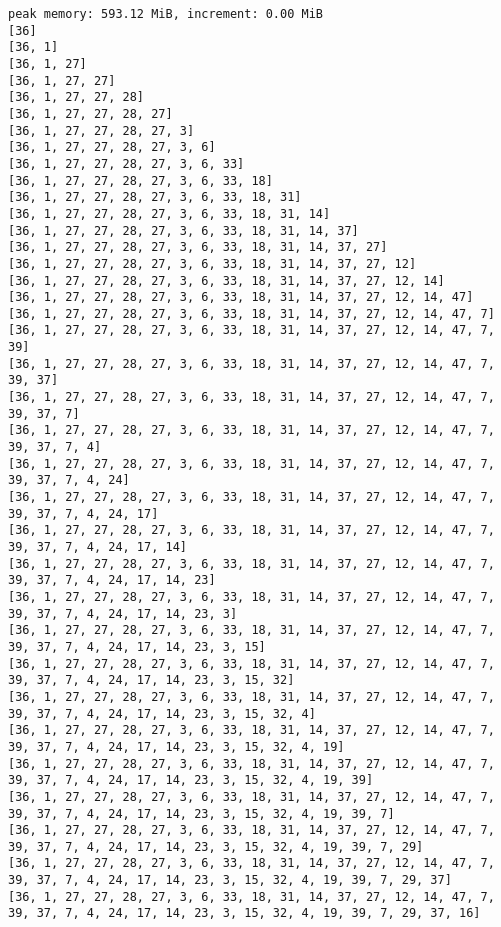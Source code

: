 \documentclass[11pt]{article}
\begin{document}
    \begin{Verbatim}[commandchars=\\\{\}]
peak memory: 593.12 MiB, increment: 0.00 MiB
[36]
[36, 1]
[36, 1, 27]
[36, 1, 27, 27]
[36, 1, 27, 27, 28]
[36, 1, 27, 27, 28, 27]
[36, 1, 27, 27, 28, 27, 3]
[36, 1, 27, 27, 28, 27, 3, 6]
[36, 1, 27, 27, 28, 27, 3, 6, 33]
[36, 1, 27, 27, 28, 27, 3, 6, 33, 18]
[36, 1, 27, 27, 28, 27, 3, 6, 33, 18, 31]
[36, 1, 27, 27, 28, 27, 3, 6, 33, 18, 31, 14]
[36, 1, 27, 27, 28, 27, 3, 6, 33, 18, 31, 14, 37]
[36, 1, 27, 27, 28, 27, 3, 6, 33, 18, 31, 14, 37, 27]
[36, 1, 27, 27, 28, 27, 3, 6, 33, 18, 31, 14, 37, 27, 12]
[36, 1, 27, 27, 28, 27, 3, 6, 33, 18, 31, 14, 37, 27, 12, 14]
[36, 1, 27, 27, 28, 27, 3, 6, 33, 18, 31, 14, 37, 27, 12, 14, 47]
[36, 1, 27, 27, 28, 27, 3, 6, 33, 18, 31, 14, 37, 27, 12, 14, 47, 7]
[36, 1, 27, 27, 28, 27, 3, 6, 33, 18, 31, 14, 37, 27, 12, 14, 47, 7, 39]
[36, 1, 27, 27, 28, 27, 3, 6, 33, 18, 31, 14, 37, 27, 12, 14, 47, 7, 39, 37]
[36, 1, 27, 27, 28, 27, 3, 6, 33, 18, 31, 14, 37, 27, 12, 14, 47, 7, 39, 37, 7]
[36, 1, 27, 27, 28, 27, 3, 6, 33, 18, 31, 14, 37, 27, 12, 14, 47, 7, 39, 37, 7, 4]
[36, 1, 27, 27, 28, 27, 3, 6, 33, 18, 31, 14, 37, 27, 12, 14, 47, 7, 39, 37, 7, 4, 24]
[36, 1, 27, 27, 28, 27, 3, 6, 33, 18, 31, 14, 37, 27, 12, 14, 47, 7, 39, 37, 7, 4, 24, 17]
[36, 1, 27, 27, 28, 27, 3, 6, 33, 18, 31, 14, 37, 27, 12, 14, 47, 7, 39, 37, 7, 4, 24, 17, 14]
[36, 1, 27, 27, 28, 27, 3, 6, 33, 18, 31, 14, 37, 27, 12, 14, 47, 7, 39, 37, 7, 4, 24, 17, 14, 23]
[36, 1, 27, 27, 28, 27, 3, 6, 33, 18, 31, 14, 37, 27, 12, 14, 47, 7, 39, 37, 7, 4, 24, 17, 14, 23, 3]
[36, 1, 27, 27, 28, 27, 3, 6, 33, 18, 31, 14, 37, 27, 12, 14, 47, 7, 39, 37, 7, 4, 24, 17, 14, 23, 3, 15]
[36, 1, 27, 27, 28, 27, 3, 6, 33, 18, 31, 14, 37, 27, 12, 14, 47, 7, 39, 37, 7, 4, 24, 17, 14, 23, 3, 15, 32]
[36, 1, 27, 27, 28, 27, 3, 6, 33, 18, 31, 14, 37, 27, 12, 14, 47, 7, 39, 37, 7, 4, 24, 17, 14, 23, 3, 15, 32, 4]
[36, 1, 27, 27, 28, 27, 3, 6, 33, 18, 31, 14, 37, 27, 12, 14, 47, 7, 39, 37, 7, 4, 24, 17, 14, 23, 3, 15, 32, 4, 19]
[36, 1, 27, 27, 28, 27, 3, 6, 33, 18, 31, 14, 37, 27, 12, 14, 47, 7, 39, 37, 7, 4, 24, 17, 14, 23, 3, 15, 32, 4, 19, 39]
[36, 1, 27, 27, 28, 27, 3, 6, 33, 18, 31, 14, 37, 27, 12, 14, 47, 7, 39, 37, 7, 4, 24, 17, 14, 23, 3, 15, 32, 4, 19, 39, 7]
[36, 1, 27, 27, 28, 27, 3, 6, 33, 18, 31, 14, 37, 27, 12, 14, 47, 7, 39, 37, 7, 4, 24, 17, 14, 23, 3, 15, 32, 4, 19, 39, 7, 29]
[36, 1, 27, 27, 28, 27, 3, 6, 33, 18, 31, 14, 37, 27, 12, 14, 47, 7, 39, 37, 7, 4, 24, 17, 14, 23, 3, 15, 32, 4, 19, 39, 7, 29, 37]
[36, 1, 27, 27, 28, 27, 3, 6, 33, 18, 31, 14, 37, 27, 12, 14, 47, 7, 39, 37, 7, 4, 24, 17, 14, 23, 3, 15, 32, 4, 19, 39, 7, 29, 37, 16]

\end{Verbatim}
\end{document}
